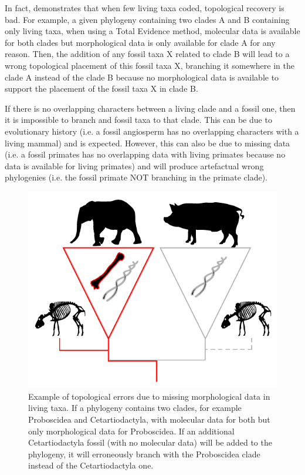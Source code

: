 \documentclass[12pt,letterpaper]{article}
\begin{document}
In fact, \cite{GuillermeCooper} demonstrates that when few living taxa coded, topological recovery is bad.
For example, a given phylogeny containing two clades A and B containing only living taxa,
when using a Total Evidence method, molecular data is available for both clades but morphological data is only available for clade A for any reason. Then, the addition of any fossil taxa X related to clade B will lead to a wrong topological placement of this fossil taxa X, branching it somewhere in the clade A instead of the clade B because no morphological data is available to support the placement of the fossil taxa X in clade B.  

If there is no overlapping characters between a living clade and a fossil one, then it is impossible to branch and fossil taxa to that clade. This can be due to evolutionary history (i.e. a fossil angiosperm has no overlapping characters with a living mammal) and is expected. However, this can also be due to missing data (i.e. a fossil primates has no overlapping data with living primates because no data is available for living primates) and will produce artefactual wrong phylogenies (i.e. the fossil primate NOT branching in the primate clade).


\begin{figure}[!htbp]
\centering
    \includegraphics[width=1\textwidth]{MissingDataFigure.pdf}
\caption{Example of topological errors due to missing morphological data in living taxa. If a phylogeny contains two clades, for example Proboscidea and Cetartiodactyla, with molecular data for both but only morphological data for Proboscidea. If an additional Cetartiodactyla fossil (with no molecular data) will be added to the phylogeny, it will erroneously branch with the Proboscidea clade instead of the Cetartiodactyla one.}
\label{Figure_missing_data_problem}
\end{figure}
\end{document}
